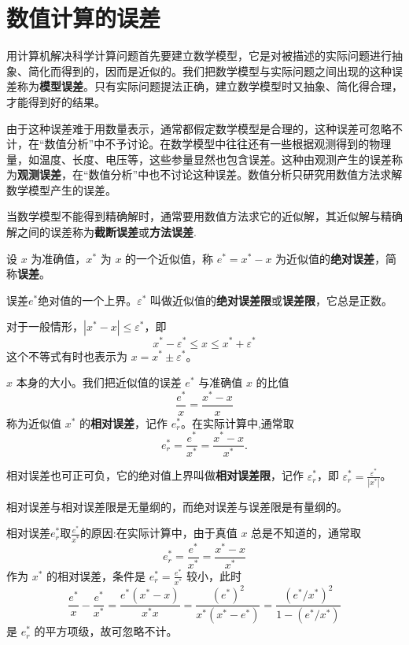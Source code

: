 \documentclass[../../main.tex]{subfiles}
\begin{document}
\section{数值计算的误差}

用计算机解决科学计算问题首先要建立数学模型，它是对被描述的实际问题进行抽象、简化而得到的，因而是近似的。我们把数学模型与实际问题之间出现的这种误差称为\textbf{模型误差}。只有实际问题提法正确，建立数学模型时又抽象、简化得合理，才能得到好的结果。

由于这种误差难于用数量表示，通常都假定数学模型是合理的，这种误差可忽略不计，在“数值分析”中不予讨论。在数学模型中往往还有一些根据观测得到的物理量，如温度、长度、电压等，这些参量显然也包含误差。这种由观测产生的误差称为\textbf{观测误差}，在“数值分析”中也不讨论这种误差。数值分析只研究用数值方法求解数学模型产生的误差。

当数学模型不能得到精确解时，通常要用数值方法求它的近似解，其近似解与精确解之间的误差称为\textbf{截断误差}或\textbf{方法误差}.

\begin{definition}[误差和误差限]
设 $x$ 为准确值，$x^*$ 为 $x$ 的一个近似值，称 $e^* = x^* - x$ 为近似值的\textbf{绝对误差}，简称\textbf{误差}。

误差$e^*$绝对值的一个上界。$\varepsilon^*$ 叫做近似值的\textbf{绝对误差限}或\textbf{误差限}，它总是正数。

对于一般情形，$|x^* - x| \leqslant \varepsilon^*$，即 
\[
x^* - \varepsilon^* \leqslant x \leqslant x^* + \varepsilon^*
\]
这个不等式有时也表示为 $x = x^* \pm \varepsilon^*$。
\end{definition}

\begin{definition}[相对误差和相对误差限]
$x$ 本身的大小。我们把近似值的误差 $e^*$ 与准确值 $x$ 的比值 
\[
\frac{e^*}{x} = \frac{x^* - x}{x}
\]
称为近似值 $x^*$ 的\textbf{相对误差}，记作 $e_r^*$。在实际计算中,通常取 
\[
e_r^* = \frac{e^*}{x^*} = \frac{x^* - x}{x^*}.
\]

相对误差也可正可负，它的绝对值上界叫做\textbf{相对误差限}，记作 $\varepsilon_r^*$，即 $\varepsilon_r^* = \frac{\varepsilon^*}{|x^*|}$。
\end{definition}
\begin{remark}
相对误差与相对误差限是无量纲的，而绝对误差与误差限是有量纲的。
\end{remark}
\begin{remark}
相对误差$e_r^*$取$\frac{e^*}{x^*}$的原因:在实际计算中，由于真值 $x$ 总是不知道的，通常取 
\[
e_r^* = \frac{e^*}{x^*} = \frac{x^* - x}{x^*}
\]
作为 $x^*$ 的相对误差，条件是 $e_r^* = \frac{e^*}{x^*}$ 较小，此时 
\[
\frac{e^*}{x} - \frac{e^*}{x^*} = \frac{e^* (x^* - x)}{x^* x} = \frac{(e^*)^2}{x^* (x^* - e^*)} = \frac{(e^*/x^*)^2}{1 - (e^*/x^*)}
\]
是 $e_r^*$ 的平方项级，故可忽略不计。
\end{remark}
\end{document}

